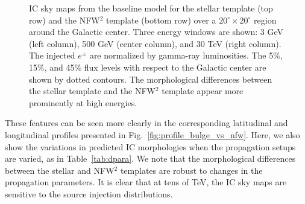 \documentclass[doublespace,nopageskip]{VTthesis}
\begin{document}
\begin{figure}[htb]
    \caption{IC sky maps from the baseline model for the stellar template (top row) and the NFW$^2$ template (bottom row) over a $20^\circ\times 20^\circ$ region around the Galactic center. Three energy windows are shown: 3 GeV (left column), 500 GeV (center column), and 30 TeV (right column). The injected $e^\pm$ are normalized by gamma-ray luminosities. The 5\%, 15\%, and 45\% flux levels with respect to the Galactic center are shown by dotted contours. The morphological differences between the stellar template and the NFW$^2$ template appear more prominently at high energies.}
    \label{fig:skymap_bulge_vs_nfw}
\end{figure}

These features can be seen more clearly in the corresponding latitudinal and longitudinal profiles presented in Fig.~\ref{fig:profile_bulge_vs_nfw}. Here, we also show the variations in predicted IC morphologies when the propagation setups are varied, as in Table~\ref{tab:dpara}. We note that the morphological differences between the stellar and NFW$^2$ templates are robust to changes in the propagation parameters. It is clear that at tens of TeV, the IC sky maps are sensitive to the source injection distributions.
\end{document}
